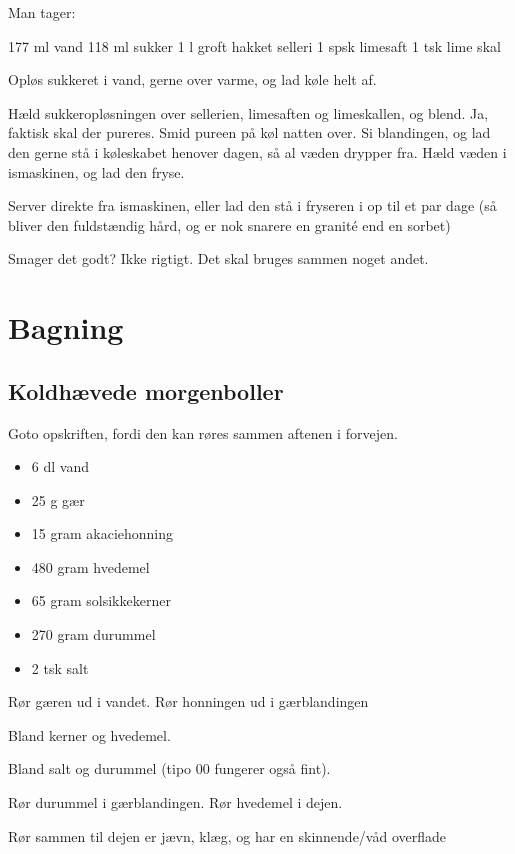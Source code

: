 \documentclass[
]{book}
\providecommand{\tightlist}{%
  \setlength{\itemsep}{0pt}\setlength{\parskip}{0pt}}
\begin{document}
Man tager:

177 ml vand
118 ml sukker
1 l groft hakket selleri
1 spsk limesaft
1 tsk lime skal

Opløs sukkeret i vand, gerne over varme, og lad køle helt af.

Hæld sukkeropløsningen over sellerien, limesaften og limeskallen, og blend. Ja, faktisk skal der pureres. Smid pureen på køl natten over. Si blandingen, og lad den gerne stå i køleskabet henover dagen, så al væden drypper fra. Hæld væden i ismaskinen, og lad den fryse.

Server direkte fra ismaskinen, eller lad den stå i fryseren i op til et par dage (så bliver den fuldstændig hård, og er nok snarere en granité end en sorbet)

Smager det godt? Ikke rigtigt. Det skal bruges sammen noget andet.

\hypertarget{bagning}{%
\chapter{Bagning}\label{bagning}}

\hypertarget{koldhuxe6vede-morgenboller}{%
\section{Koldhævede morgenboller}\label{koldhuxe6vede-morgenboller}}

Goto opskriften, fordi den kan røres sammen aftenen i forvejen.

\begin{itemize}
\tightlist
\item
  6 dl vand
\item
  25 g gær
\item
  15 gram akaciehonning
\item
  480 gram hvedemel
\item
  65 gram solsikkekerner
\item
  270 gram durummel
\item
  2 tsk salt
\end{itemize}

Rør gæren ud i vandet.
Rør honningen ud i gærblandingen

Bland kerner og hvedemel.

Bland salt og durummel (tipo 00 fungerer også fint).

Rør durummel i gærblandingen.
Rør hvedemel i dejen.

Rør sammen til dejen er jævn, klæg, og har en skinnende/våd
overflade
\end{document}
